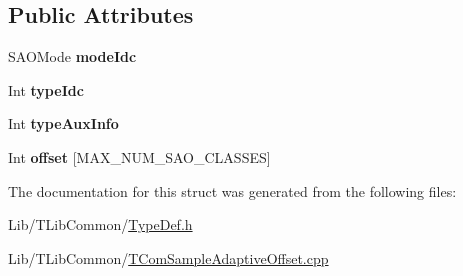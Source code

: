 \subsection*{Public Attributes}
\begin{DoxyCompactItemize}
\item 
\mbox{\label{struct_s_a_o_offset_af97d2a097a098aee07c884b5dd0315ea}} 
S\+A\+O\+Mode {\bfseries mode\+Idc}
\item 
\mbox{\label{struct_s_a_o_offset_af7dc58e3e74ce79d3c4d991af292c466}} 
Int {\bfseries type\+Idc}
\item 
\mbox{\label{struct_s_a_o_offset_aed84f8aa47d1be892b8e312716de4257}} 
Int {\bfseries type\+Aux\+Info}
\item 
\mbox{\label{struct_s_a_o_offset_a3017a38b030288c238f90f2754342978}} 
Int {\bfseries offset} \mbox{[}M\+A\+X\+\_\+\+N\+U\+M\+\_\+\+S\+A\+O\+\_\+\+C\+L\+A\+S\+S\+ES\mbox{]}
\end{DoxyCompactItemize}


The documentation for this struct was generated from the following files\+:\begin{DoxyCompactItemize}
\item 
Lib/\+T\+Lib\+Common/\hyperlink{_type_def_8h}{Type\+Def.\+h}\item 
Lib/\+T\+Lib\+Common/\hyperlink{_t_com_sample_adaptive_offset_8cpp}{T\+Com\+Sample\+Adaptive\+Offset.\+cpp}\end{DoxyCompactItemize}
